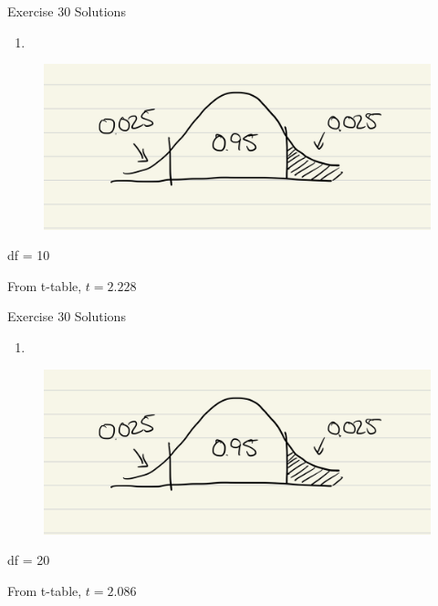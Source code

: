 \documentclass[
  ignorenonframetext,
]{beamer}
\providecommand{\tightlist}{%
  \setlength{\itemsep}{0pt}\setlength{\parskip}{0pt}}\usepackage{longtable,booktabs,array}
\begin{document}
\begin{frame}{Exercise 30 Solutions}
\protect\hypertarget{exercise-30-solutions}{}
\begin{enumerate}[<+->]
[a.]
\tightlist
\item
\end{enumerate}

\begin{figure}

{\centering \includegraphics{images/central95.png}

}

\end{figure}

df = 10

From t-table, \(t = 2.228\)
\end{frame}

\begin{frame}{Exercise 30 Solutions}
\protect\hypertarget{exercise-30-solutions-1}{}
\begin{enumerate}[<+->]
[a.]
\setcounter{enumi}{1}
\tightlist
\item
\end{enumerate}

\begin{figure}

{\centering \includegraphics{images/central95.png}

}

\end{figure}

df = 20

From t-table, \(t = 2.086\)
\end{frame}
\end{document}
